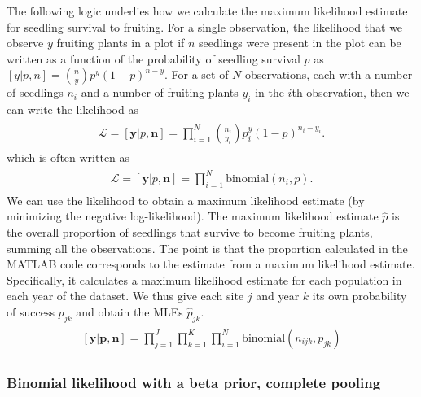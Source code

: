 \documentclass[12pt, oneside, titlepage]{article}   	%
\begin{document}
The following logic underlies how we calculate the maximum likelihood estimate for seedling survival to fruiting. For a single observation, the likelihood that we observe $y$ fruiting plants in a plot if $n$ seedlings were present in the plot can be written as a function of the probability of seedling survival $p$ as $[y|p,n] = \binom{n}{y}p^y(1-p)^{n-y}$. For a set of $N$ observations, each with a number of seedlings $n_i$ and a number of fruiting plants $y_i$ in the $i$th observation, then we can write the likelihood as
%
\begin{align}
  \begin{split}
\mathcal{L} = [\bm{y}|p,\bm{n}]  = \prod_{i=1}^N \binom{n_i}{y_i}p^y_i(1-p)^{n_i-y_i}.
  \end{split}
\end{align}
%
which is often written as
%
\begin{align}
  \begin{split}
\mathcal{L} = [\bm{y}|p,\bm{n}]  = \prod_{i=1}^N \mathrm{binomial}(n_i,p).
  \end{split}
\end{align}
We can use the likelihood to obtain a maximum likelihood estimate (by minimizing the negative log-likelihood). The maximum likelihood estimate $\hat{p}$ is the overall proportion of seedlings that survive to become fruiting plants, summing all the observations. The point is that the proportion calculated in the MATLAB code corresponds to the estimate from a maximum likelihood estimate. Specifically, it calculates a maximum likelihood estimate for each population in each year of the dataset. We thus give each site $j$ and year $k$ its own probability of success $p_{jk}$ and obtain the MLEs $\hat{p}_{jk}$.
%
\begin{align}
  \begin{split}
[\bm{y}|\bm{p},\bm{n}]  = \prod_{j=1}^J\prod_{k=1}^K\prod_{i=1}^N \mathrm{binomial}(n_{ijk},p_{jk}) \label{eq:frequentistMLE}
  \end{split}
\end{align}

\subsubsection*{Binomial likelihood with a beta prior, complete pooling}
\end{document}
